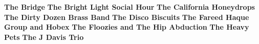 \vspace{10pt} 
\newline
\vspace{10pt} 
\noindent \textbf{The Bridge}\newline
\vspace{10pt} 
\newline
\vspace{10pt} 
\noindent \textbf{The Bright Light Social Hour}\newline
\vspace{10pt} 
\newline
\vspace{10pt} 
\noindent \textbf{The California Honeydrops}\newline
\vspace{10pt} 
\newline
\vspace{10pt} 
\noindent \textbf{The Dirty Dozen Brass Band}\newline
\vspace{10pt} 
\newline
\vspace{10pt} 
\noindent \textbf{The Disco Biscuits}\newline
\vspace{10pt} 
\newline
\vspace{10pt} 
\noindent \textbf{The Fareed Haque Group and Hobex}\newline
\vspace{10pt} 
\newline
\vspace{10pt} 
\noindent \textbf{The Floozies and The Hip Abduction}\newline
\vspace{10pt} 
\newline
\vspace{10pt} 
\noindent \textbf{The Heavy Pets}\newline
\vspace{10pt} 
\newline
\vspace{10pt} 
\noindent \textbf{The J Davis Trio}\newline

